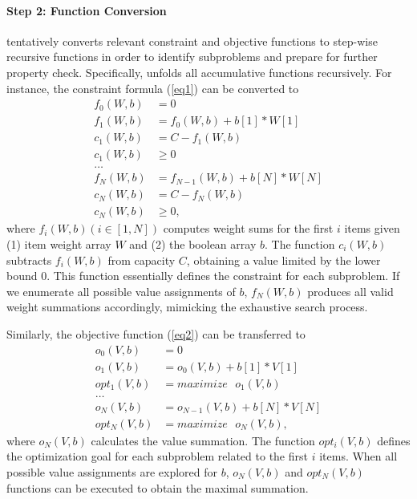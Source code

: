 \paragraph{Step 2: Function Conversion}
\tool tentatively converts relevant constraint and objective functions to step-wise recursive functions in order to identify subproblems and prepare for further property check. 
Specifically, 
\tool unfolds all accumulative functions 
recursively. 
For instance, the constraint formula (\ref{eq1}) can be converted to
\begin{align}
\label{fun1}
f_0(W, b)&=0 \nonumber\\
f_1(W, b)&=f_0(W, b) + b[1] * W[1] \nonumber\\
c_1(W, b)&=C-f_1(W, b)\nonumber\\
c_1(W, b)&\ge0 \nonumber\\
\ldots \tag{3.3}\\  
f_N(W, b)&=f_{N-1}(W, b) + b[N] * W[N] \nonumber\\
c_N(W, b)&=C-f_N(W, b) \nonumber\\
c_N(W, b)& \ge 0, \nonumber
\end{align}
where $f_i(W, b) (i\in[1, N])$ computes weight sums for the first $i$ items given (1) item weight array $W$ and (2) the boolean array $b$.
The function $c_i(W, b)$ subtracts $f_i(W, b)$ from capacity $C$, obtaining a value limited by the lower bound $0$. This function essentially defines the constraint for each subproblem.  
If we enumerate all possible value assignments of $b$, $f_N(W, b)$ produces all valid weight summations accordingly, mimicking the exhaustive search process. 

Similarly, the objective function (\ref{eq2}) can be transferred to
\begin{align}
\label{fun2}
o_0(V, b)&=0 \nonumber\\
o_1(V, b)&=o_0(V, b) + b[1] * V[1]\nonumber\\
opt_1(V, b)&=maximize \text{ }o_1(V, b) \nonumber\\
\ldots \tag{3.4}\\
o_N(V, b)&=o_{N-1}(V, b) + b[N] * V[N]\nonumber\\
opt_N(V, b)&=maximize\text{ }o_N(V, b), \nonumber
\end{align}
where $o_N(V, b)$ calculates the value summation.
The function $opt_i(V, b)$ defines the optimization goal for each subproblem related to the first $i$ items. When all possible value assignments are explored for $b$, $o_N(V, b)$ and $opt_N(V, b)$ functions can be executed to obtain the maximal summation. 

